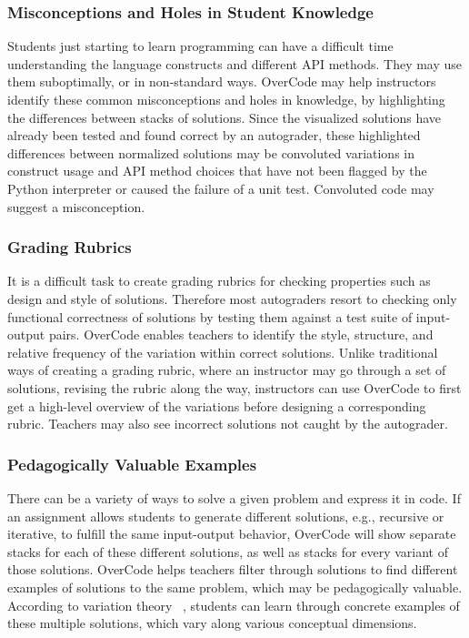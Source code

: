 \subsubsection{Misconceptions and Holes in Student Knowledge}
Students just starting to learn programming can have a difficult time understanding the language constructs and different API methods. They may use them suboptimally, or in non-standard ways. OverCode may help instructors identify these common misconceptions and holes in knowledge, by highlighting the differences between stacks of solutions. Since the visualized solutions have already been tested and found correct by an autograder, these highlighted differences between normalized solutions may be convoluted variations in construct usage and API method choices that have not been flagged by the Python interpreter or caused the failure of a unit test. Convoluted code may suggest a misconception.

\subsubsection{Grading Rubrics}
It is a difficult task to create grading rubrics for checking properties such as design and style of solutions. Therefore most autograders resort to checking only functional correctness of solutions by testing them against a test suite of input-output pairs. OverCode enables teachers to identify the style, structure, and relative frequency of the variation within correct solutions. Unlike traditional ways of creating a grading rubric, where an instructor may go through a set of solutions, revising the rubric along the way, instructors can use OverCode to first get a high-level overview of the variations before designing a corresponding rubric. Teachers may also see incorrect solutions not caught by the autograder.

\subsubsection{Pedagogically Valuable Examples} 
There can be a variety of ways to solve a given problem and express it in code. If an assignment allows students to generate different solutions, e.g., recursive or iterative, to fulfill the same input-output behavior, OverCode will show separate stacks for each of these different solutions, as well as stacks for every variant of those solutions. OverCode helps teachers filter through solutions to find different examples of solutions to the same problem, which may be pedagogically valuable. According to variation theory ~\cite{marton13}, students can learn through concrete examples of these multiple solutions, which vary along various conceptual dimensions.
